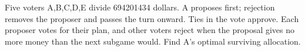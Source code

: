 Five voters A,B,C,D,E divide 694201434 dollars. A proposes first; rejection removes the proposer and passes the turn onward. Ties in the vote approve. Each proposer votes for their plan, and other voters reject when the proposal gives no more money than the next subgame would. Find A's optimal surviving allocation.
